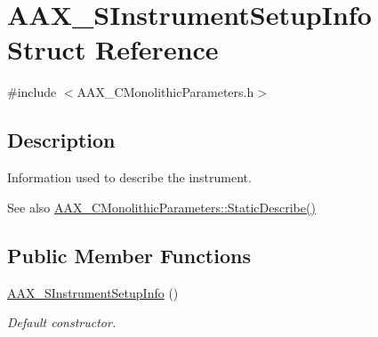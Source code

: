 \hypertarget{a01957}{}\section{A\+A\+X\+\_\+\+S\+Instrument\+Setup\+Info Struct Reference}
\label{a01957}


{\ttfamily \#include $<$A\+A\+X\+\_\+\+C\+Monolithic\+Parameters.\+h$>$}



\subsection{Description}
Information used to describe the instrument. 

\begin{DoxySeeAlso}{See also}
\mbox{\hyperlink{a01969_a69f9b80a70ecc6b7b2a7eec372d2502a}{A\+A\+X\+\_\+\+C\+Monolithic\+Parameters\+::\+Static\+Describe()}} 
\end{DoxySeeAlso}
\subsection*{Public Member Functions}
\begin{DoxyCompactItemize}
\item 
\mbox{\hyperlink{a01957_ac5626759986bbe38a6bc9790861c1591}{A\+A\+X\+\_\+\+S\+Instrument\+Setup\+Info}} ()
\begin{DoxyCompactList}\small\item\em Default constructor. \end{DoxyCompactList}\end{DoxyCompactItemize}
